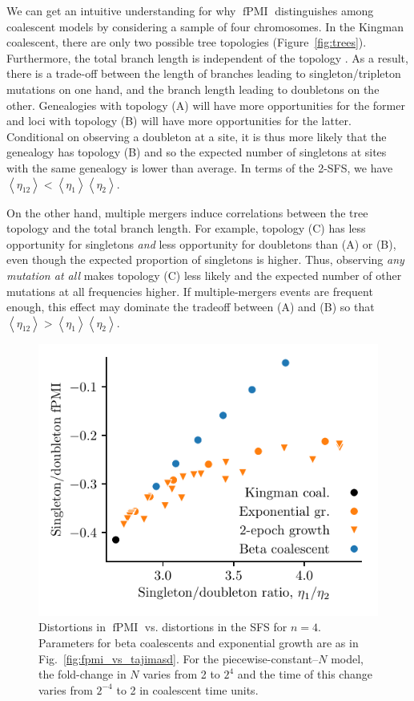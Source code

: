 \documentclass[11pt, letterpaper]{article}   	%
\newcommand{\fig}[1]{Fig.~\ref{#1}}
\newcommand{\Fig}[1]{Figure~\ref{#1}}
\newcommand{\E}[1]{\left< #1 \right>}
\DeclareMathOperator{\fpmi}{fPMI}
\begin{document}
We can get an intuitive understanding for why $\fpmi$ distinguishes among coalescent models by considering a sample of four chromosomes.
In the Kingman coalescent, there are only two possible tree topologies (\Fig{fig:trees}).
Furthermore, the total branch length is independent of the topology \autocite{Wakeley2009}.
As a result, there is a trade-off between the length of branches leading to singleton/tripleton mutations on one hand, and the branch length leading to doubletons on the other.
Genealogies with topology (A) will have more opportunities for the former and loci with topology (B) will have more opportunities for the latter.
Conditional on observing a doubleton at a site, it is thus more likely that the genealogy has topology (B) and so the expected number of singletons at sites with the same genealogy is lower than average.
In terms of the 2-SFS, we have $\E{\eta_{12}} < \E{\eta_{1}} \E{\eta_{2}}$.

On the other hand, multiple mergers induce correlations between the tree topology and the total branch length.
For example, topology (C) has less opportunity for singletons \emph{and} less opportunity for doubletons than (A) or (B), even though the expected proportion of singletons is higher.
Thus, observing \emph{any mutation at all} makes topology (C) less likely and the expected number of other mutations at all frequencies higher.
If multiple-mergers events are frequent enough, this effect may dominate the tradeoff between (A) and (B) so that $\E{\eta_{12}} > \E{\eta_{1}} \E{\eta_{2}}$.

\begin{figure}
\centering
\includegraphics[scale=1]{figures/singleton-doubleton.pdf}
\caption{Distortions in $\fpmi$ vs. distortions in the SFS for $n=4$. Parameters for beta coalescents and exponential growth are as in \fig{fig:fpmi_vs_tajimasd}. For the piecewise-constant--$N$ model, the fold-change in $N$ varies from 2 to $2^4$ and the time of this change varies from $2^{-4}$ to 2 in coalescent time units. \label{fig:sdpmi_vs_sdratio}}
\end{figure}
\end{document}
